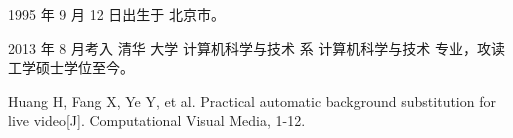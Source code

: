 \begin{resume}


  1995 年 9 月 12 日出生于 北京市。

  2013 年 8 月考入 清华 大学 计算机科学与技术 系 计算机科学与技术 专业，攻读工学硕士学位至今。



 
  \begin{publications}
    \item Huang H, Fang X, Ye Y, et al. Practical automatic background substitution for live video[J]. Computational Visual Media, 1-12.
  \end{publications}

  
\end{resume}
